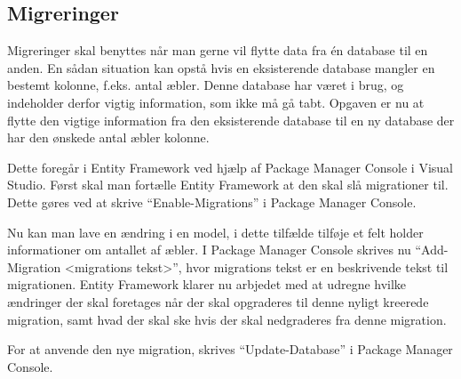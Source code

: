 \subsection{Migreringer}
\label{sub:migreringer}

Migreringer skal benyttes når man gerne vil flytte data fra én database til en anden. En sådan situation kan opstå hvis en eksisterende database mangler en bestemt kolonne, f.eks. antal æbler. Denne database har været i brug, og indeholder derfor vigtig information, som ikke må gå tabt. Opgaven er nu at flytte den vigtige information fra den eksisterende database til en ny database der har den ønskede antal æbler kolonne.

Dette foregår i Entity Framework ved hjælp af Package Manager Console i Visual Studio. Først skal man fortælle Entity Framework at den skal slå migrationer til. Dette gøres ved at skrive \enquote{Enable-Migrations} i Package Manager Console.

Nu kan man lave en ændring i en model, i dette tilfælde tilføje et felt holder informationer om antallet af æbler. I Package Manager Console skrives nu \enquote{Add-Migration <migrations tekst>}, hvor migrations tekst er en beskrivende tekst til migrationen. Entity Framework klarer nu arbjedet med at udregne hvilke ændringer der skal foretages når der skal opgraderes til denne nyligt kreerede migration, samt hvad der skal ske hvis der skal nedgraderes fra denne migration.

For at anvende den nye migration, skrives \enquote{Update-Database} i Package Manager Console.
